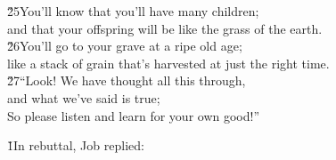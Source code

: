 \begin{poetry}
\poeml \v{25}You'll know that you'll have many children; \\
\poemll    and that your offspring will be like the grass of the earth. \\
\poeml \v{26}You'll go to your grave at a ripe old age; \\
\poemll    like a stack of grain that's harvested at just the right time. \\
\poeml \v{27}``Look! We have thought all this through, \\
\poemll    and what we've said is true; \\
\poemlll       So please listen and learn for your own good!''
\end{poetry}

\v{1}In rebuttal, Job replied:

